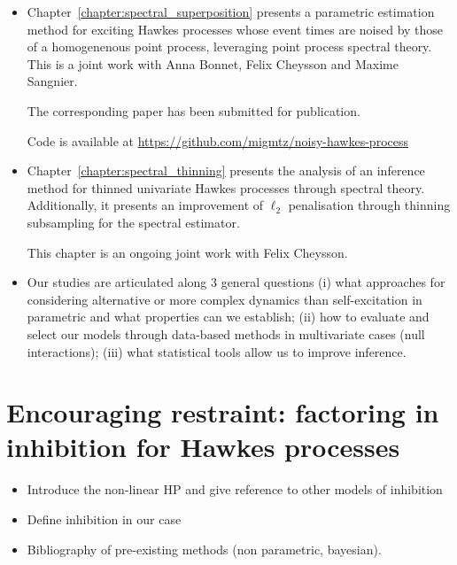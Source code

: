     \begin{itemize}
      \item Chapter~\ref{chapter:spectral_superposition} presents a parametric estimation method for exciting Hawkes processes whose event times are noised by those of a homogenenous point process, leveraging point process spectral theory. 
      This is a joint work with Anna Bonnet, Felix Cheysson and Maxime Sangnier. 

      The corresponding paper \parencite{Bonnet2024} has been submitted for publication.

      Code is available at \url{https://github.com/migmtz/noisy-hawkes-process}

      \item Chapter~\ref{chapter:spectral_thinning} presents the analysis of an inference method for thinned univariate Hawkes processes through spectral theory. 
      Additionally, it presents an improvement of $\ell_2$ penalisation through thinning subsampling for the spectral estimator.

      This chapter is an ongoing joint work with Felix Cheysson.
    \end{itemize}
    


    \begin{itemize}
        \item Our studies are articulated along 3 general questions (i) what approaches for considering alternative or more complex dynamics than self-excitation in parametric and what properties can we establish; (ii) how to evaluate and select our models through data-based methods in multivariate cases (null interactions); (iii) what statistical tools allow us to improve inference.
    \end{itemize}

\section{Encouraging restraint: factoring in inhibition for Hawkes processes}\label{sec:chap0_inhibition}
    \begin{itemize}
        \item Introduce the non-linear HP and give reference to other models of inhibition 
        \item Define inhibition in our case
        \item Bibliography of pre-existing methods (non parametric, bayesian).
    \end{itemize}
